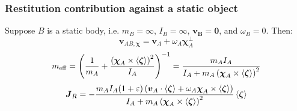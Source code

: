 \documentclass[10pt]{report}
\DeclareMathOperator{\eff}{eff}
\begin{document}
\subsubsection{Restitution contribution against a static object}
Suppose $B$ is a static body, i.e. $m_B=\infty$, $I_B=\infty$, $\boldsymbol{v_B}=\boldsymbol{0}$, and $\omega_B=0$. Then:
\begin{equation}\boldsymbol{v}_{AB,\boldsymbol{\chi}}=\boldsymbol{v}_A+\omega_A\boldsymbol{\chi}_A^\perp\end{equation}
\begin{equation}m_{\eff}=\left(\frac{1}{m_A}+\frac{\left(\boldsymbol{\chi}_A\times\braket{\boldsymbol{\zeta}}\right)^2}{I_A}\right)^{-1}=\frac{m_AI_A}{I_A+m_A\left(\boldsymbol{\chi}_A\times\braket{\boldsymbol{\zeta}}\right)^2}\end{equation}
\begin{equation}\boldsymbol{J}_R=-\frac{m_AI_A(1+\varepsilon)\left(\boldsymbol{v}_A\cdot\braket{\boldsymbol{\zeta}}+\omega_A\boldsymbol{\chi}_A\times\braket{\boldsymbol{\zeta}}\right)}{I_A+m_A\left(\boldsymbol{\chi}_A\times\braket{\boldsymbol{\zeta}}\right)^2}\braket{\boldsymbol{\zeta}}\end{equation}
\end{document}
